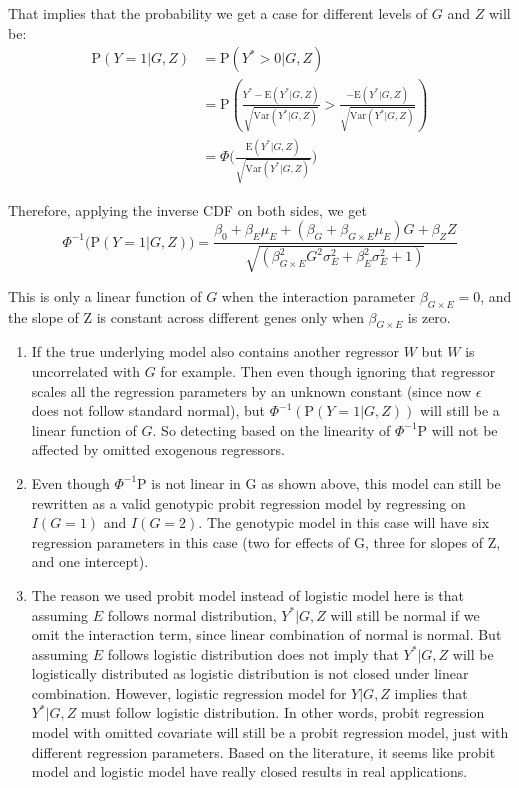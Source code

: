 \documentclass[
]{article}
\begin{document}
That implies that the probability we get a case for different levels of
\(G\) and \(Z\) will be:
\begin{equation}\label{eqn:probitModelWithInteraction_Prob} 
\begin{aligned} 
\text{P}(Y = 1 | G, Z) &= \text{P}(Y^* > 0| G, Z) \\ 
                           &= \text{P}(\frac{Y^*  - \text{E}(Y^* |G,Z)}{\sqrt{\text{Var}(Y^* |G,Z)}} > \frac{-\text{E}(Y^* |G,Z)}{\sqrt{\text{Var}(Y^* |G,Z)}}) \\
                           &= \Phi \bigg( \frac{\text{E}(Y^* |G,Z)}{\sqrt{\text{Var}(Y^* |G,Z)}} \bigg)
\end{aligned}
\end{equation}

Therefore, applying the inverse CDF on both sides, we get
\[\Phi^{-1} \bigg(\text{P}(Y = 1 | G, Z) \bigg) = \frac{\beta_0+\beta_E \mu_E+(\beta_G + \beta_{G\times E} \mu_E)G + \beta_Z Z}{\sqrt{(\beta_{G\times E}^2 G^2 \sigma_E^2 + \beta_E^2 \sigma_E^2 + 1)}} \]

This is only a linear function of \(G\) when the interaction parameter
\(\beta_{G\times E} = 0\), and the slope of Z is constant across
different genes only when \(\beta_{G\times E}\) is zero.

\begin{enumerate}
\item If the true underlying model also contains another regressor $W$ but $W$ is uncorrelated with $G$ for example. Then even though ignoring that regressor scales all the regression parameters by an unknown constant (since now $\epsilon$ does not follow standard normal), but $\Phi^{-1}(\text{P}(Y = 1|G,Z))$ will still be a linear function of $G$. So detecting based on the linearity of $\Phi^{-1}\text{P}$ will not be affected by omitted exogenous regressors.
\item Even though $\Phi^{-1}\text{P}$ is not linear in G as shown above, this model can still be rewritten as a valid genotypic probit regression model by regressing on $I(G=1)$ and $I(G=2)$. The genotypic model in this case will have six regression parameters in this case (two for effects of G, three for slopes of Z, and one intercept).
\item The reason we used probit model instead of logistic model here is that assuming $E$ follows normal distribution, $Y^*|G,Z$ will still be normal if we omit the interaction term, since linear combination of normal is normal. But assuming $E$ follows logistic distribution does not imply that $Y^*|G,Z$ will be logistically distributed as logistic distribution is not closed under linear combination. However, logistic regression model for $Y|G,Z$ implies that $Y^*|G,Z$ must follow logistic distribution. In other words, probit regression model with omitted covariate will still be a probit regression model, just with different regression parameters. Based on the literature, it seems like probit model and logistic model have really closed results in real applications.
\end{enumerate}
\end{document}
